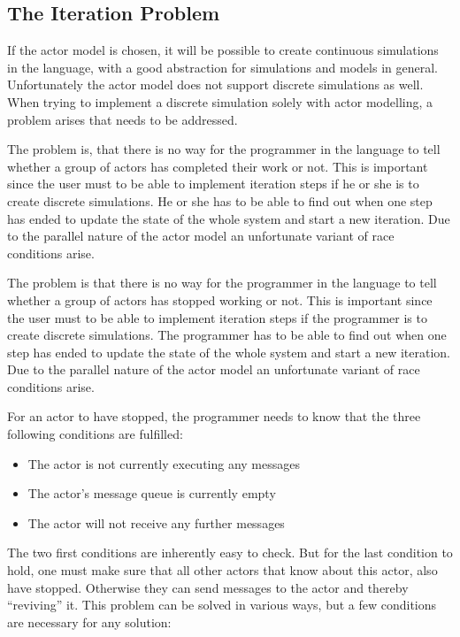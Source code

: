 \subsection{The Iteration Problem}

If the actor model is chosen, it will be possible to create continuous simulations in the language, with a good abstraction for simulations and models in general. Unfortunately the actor model does not support discrete simulations as well. When trying to implement a discrete simulation solely with actor modelling, a problem arises that needs to be addressed.
 
The problem is, that there is no way for the programmer in the language to tell whether a group of actors has completed their work or not. This is important since the user must to be able to implement iteration steps if he or she is to create discrete simulations. He or she has to be able to find out when one step has ended to update the state of the whole system and start a new iteration. Due to the parallel nature of the actor model an unfortunate variant of race conditions arise.

The problem is that there is no way for the programmer in the language to tell whether a group of actors has stopped working or not. This is important since the user must to be able to implement iteration steps if the programmer is to create discrete simulations. The programmer has to be able to find out when one step has ended to update the state of the whole system and start a new iteration. Due to the parallel nature of the actor model an unfortunate variant of race conditions arise.

For an actor to have stopped, the programmer needs to know that the three following conditions are fulfilled:
\begin{itemize}
\item The actor is not currently executing any messages
\item The actor's message queue is currently empty
\item The actor will not receive any further messages
\end{itemize} 

The two first conditions are inherently easy to check. But for the last condition to hold, one must make sure that all other actors that know about this actor, also have stopped. Otherwise they can send messages to the actor and thereby \enquote{reviving} it. This problem can be solved in various ways, but a few conditions are necessary for any solution:

